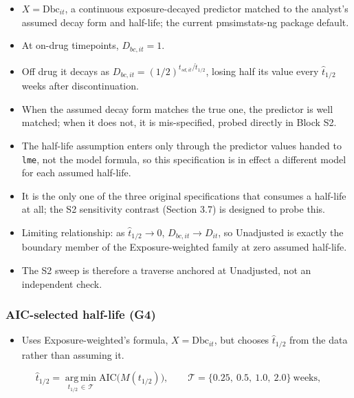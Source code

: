 \documentclass[
  11pt,
]{article}
\providecommand{\tightlist}{%
  \setlength{\itemsep}{0pt}\setlength{\parskip}{0pt}}
\begin{document}
\begin{itemize}
\tightlist
\item
  \(X = \text{Dbc}_{it}\), a continuous exposure-decayed predictor
  matched to the analyst's assumed decay form and half-life; the
  current pmsimstats-ng package default.
\item
  At on-drug timepoints, \(D_{bc,it} = 1\).
\item
  Off drug it decays as
  \(D_{bc,it} = (1/2)^{t_{sd,it}/\hat{t}_{1/2}}\), losing half its
  value every \(\hat{t}_{1/2}\) weeks after discontinuation.
\item
  When the assumed decay form matches the true one, the predictor is
  well matched; when it does not, it is mis-specified, probed
  directly in Block S2.
\item
  The half-life assumption enters only through the predictor values
  handed to \texttt{lme}, not the model formula, so this specification is in
  effect a different model for each assumed half-life.
\item
  It is the only one of the three original specifications that
  consumes a half-life at all; the S2 sensitivity contrast (Section
  3.7) is designed to probe this.
\item
  Limiting relationship: as \(\hat{t}_{1/2} \rightarrow 0\),
  \(D_{bc,it} \rightarrow D_{it}\), so Unadjusted is exactly the
  boundary member of the Exposure-weighted family at zero assumed
  half-life.
\item
  The S2 sweep is therefore a traverse anchored at Unadjusted, not an
  independent check.
\end{itemize}

\subsubsection{AIC-selected half-life (G4)}\label{aic-selected-half-life-g4}

\begin{itemize}
\tightlist
\item
  Uses Exposure-weighted's formula, \(X = \text{Dbc}_{it}\), but
  chooses \(\hat{t}_{1/2}\) from the data rather than assuming it.
\end{itemize}

\[
\hat{t}_{1/2} = \operatorname*{arg\,min}_{t_{1/2} \,\in\, \mathcal{T}}
  \text{AIC}\big(M(t_{1/2})\big), \qquad
  \mathcal{T} = \{0.25,\ 0.5,\ 1.0,\ 2.0\}\ \text{weeks},
\]
\end{document}
